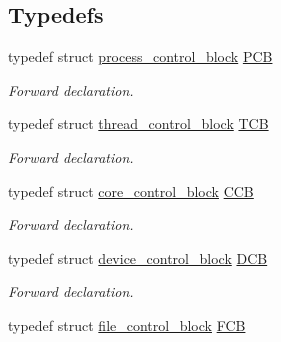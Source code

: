 \subsection*{Typedefs}
\begin{DoxyCompactItemize}
\item 
\mbox{\label{group__rlists_ga91aaadf0c3f9cef2293a99c69795323f}} 
typedef struct \hyperlink{structprocess__control__block}{process\+\_\+control\+\_\+block} \hyperlink{group__rlists_ga91aaadf0c3f9cef2293a99c69795323f}{P\+CB}
\begin{DoxyCompactList}\small\item\em Forward declaration. \end{DoxyCompactList}\item 
\mbox{\label{group__rlists_ga8e5eca0c5ec064a81ae9246c7d4f32ef}} 
typedef struct \hyperlink{structthread__control__block}{thread\+\_\+control\+\_\+block} \hyperlink{group__rlists_ga8e5eca0c5ec064a81ae9246c7d4f32ef}{T\+CB}
\begin{DoxyCompactList}\small\item\em Forward declaration. \end{DoxyCompactList}\item 
\mbox{\label{group__rlists_gac3d551eb0caa1296280ea2278b4f1b11}} 
typedef struct \hyperlink{structcore__control__block}{core\+\_\+control\+\_\+block} \hyperlink{group__rlists_gac3d551eb0caa1296280ea2278b4f1b11}{C\+CB}
\begin{DoxyCompactList}\small\item\em Forward declaration. \end{DoxyCompactList}\item 
\mbox{\label{group__rlists_ga5b4de7b0c72db6219c5a6dda2466181f}} 
typedef struct \hyperlink{structdevice__control__block}{device\+\_\+control\+\_\+block} \hyperlink{group__rlists_ga5b4de7b0c72db6219c5a6dda2466181f}{D\+CB}
\begin{DoxyCompactList}\small\item\em Forward declaration. \end{DoxyCompactList}\item 
\mbox{\label{group__rlists_ga60c6c294fa1d8ea73ed270404fe5c17d}} 
typedef struct \hyperlink{structfile__control__block}{file\+\_\+control\+\_\+block} \hyperlink{group__rlists_ga60c6c294fa1d8ea73ed270404fe5c17d}{F\+CB}

\end{DoxyCompactItemize}
